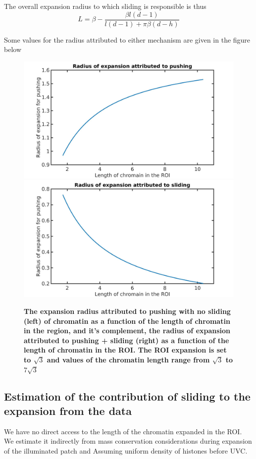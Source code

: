 \documentclass[12pt]{report}
\begin{document}
		The overall expansion radius to which sliding is responsible is thus 
		\begin{equation}\label{eq:expansionRadiusDueToSliding}
		L = \beta- \frac{\beta l(d-1)}{l(d-1) +\pi \beta(d-h)}
		\end{equation}
		
		Some values for the radius attributed to either mechanism are given in the figure below
		\begin{figure}[H]			
			\includegraphics[width=0.5\linewidth, height=0.3\textheight]{Images/SlidingModel/radiusOfPushingVsLengthOfChromainInROI}
			\includegraphics[width=0.5\linewidth, height=0.3\textheight]{Images/SlidingModel/radiusOfSlidingVsLengthOfChromatinInROI}
			\caption{\tiny{\textbf{The expansion radius attributed to pushing with no sliding (left) of chromatin as a function of the length of chromatin in the region, and it's complement, the radius of expansion attributed to pushing + sliding (right) as a function of the length of chromatin in the ROI. The ROI expansion is set to $\sqrt{3}$ and values of the chromatin length range from $\sqrt{3}$ to $7\sqrt{3}$}}}
			\label{fig:radiiVsLengthOfChromainInROI}
		\end{figure}
		
									
		\subsection{Estimation of the contribution of sliding to the expansion from the data}\label{subsection:estimationOfSlidingRadiusFromTheData}
		We have no direct access to the length of the chromatin expanded in the ROI. We estimate it indirectly from mass conservation considerations during expansion of the illuminated patch and Assuming uniform density of histones before UVC. 
		
\end{document}
